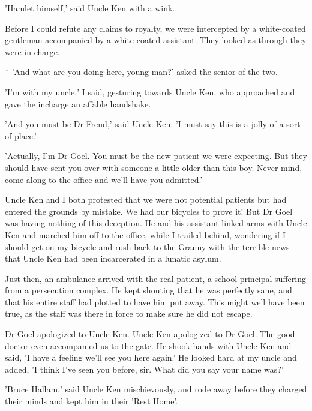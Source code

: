 \par
'Hamlet himself,' said Uncle Ken with a wink.
\par
Before I could refute any claims to royalty, we were intercepted by a white-coated gentleman accompanied by a white-coated assistant. They looked as through they were in charge.
\par¨
'And what are you doing here, young man?' asked the senior of the two.
\par
'I'm with my uncle,' I said, gesturing towards Uncle Ken, who approached and gave the incharge an affable handshake.
\par
'And you must be Dr Freud,' said Uncle Ken. 'I must say this is a jolly of a sort of place.'
\par
'Actually, I'm Dr Goel. You must be the new patient we were expecting. But they should have sent you over with someone  a little older than this boy. Never mind, come along to the office and we'll have you admitted.'
\par
Uncle Ken and I both protested that we were not potential patients but had entered the grounds by mistake. We had our bicycles to prove it! But Dr Goel was having nothing of this deception. He and his assistant linked arms with Uncle Ken and marched him off to the office, while I trailed behind, wondering if I should get on my bicycle and rush back to the Granny with the terrible news that Uncle Ken had been incarcerated in a lunatic asylum.
\par
Just then, an ambulance arrived with the real patient, a school principal suffering from a persecution complex. He kept shouting that he was perfectly sane, and that his entire staff had plotted to have him put away. This might well have been true, as the staff was there in force to make sure he did not escape.
\par
Dr Goel apologized to Uncle Ken. Uncle Ken apologized to Dr Goel. The good doctor even accompanied us to the gate. He shook hands with Uncle Ken and said, 'I have a feeling we'll see you here again.' He looked hard at my uncle and added, 'I think I've seen you before, sir. What did you say your name was?'
\par
'Bruce Hallam,' said Uncle Ken mischievously, and rode away before they charged their minds and kept him in their 'Rest Home'.

